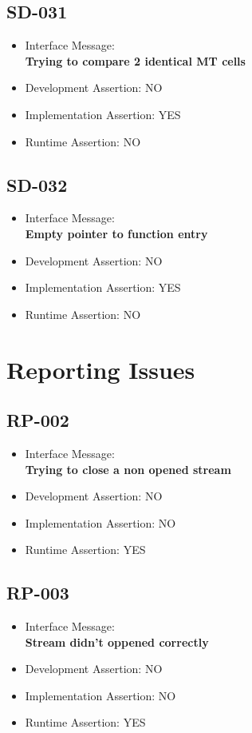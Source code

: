 \subsection{SD-031}
\begin{itemize}
  \item Interface Message:\\[1em]
    \textbf{Trying to compare 2 identical MT cells}
  \item Development Assertion: NO
  \item Implementation Assertion: YES
  \item Runtime Assertion: NO
\end{itemize}

\subsection{SD-032}
\begin{itemize}
  \item Interface Message:\\[1em]
    \textbf{Empty pointer to function entry}
  \item Development Assertion: NO
  \item Implementation Assertion: YES
  \item Runtime Assertion: NO
\end{itemize}

\section{Reporting Issues}

\subsection{RP-002}
\begin{itemize}
  \item Interface Message:\\[1em]
    \textbf{Trying to close a non opened stream}
  \item Development Assertion: NO
  \item Implementation Assertion: NO
  \item Runtime Assertion: YES
\end{itemize}

\subsection{RP-003}
\begin{itemize}
  \item Interface Message:\\[1em]
    \textbf{Stream didn't oppened correctly}
  \item Development Assertion: NO
  \item Implementation Assertion: NO
  \item Runtime Assertion: YES
\end{itemize}


